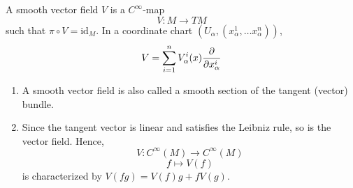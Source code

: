 \begin{definition}
            A smooth vector field \(V\) is a \(C^\infty\)-map
            \[
                V\colon M\to TM    
            \]
            such that \(\pi\circ V=\mathrm{id}_M\). In a coordinate
            chart \(\left(U_\alpha,\left(x^1_\alpha,\ldots
            x^n_\alpha
            \right)\right)\), \[
              V=\sum_{i=1}^n V^i_\alpha(x)\pdv{x^i_\alpha} 
            \]
\end{definition}
\begin{remark}
            \hfill
        \begin{enumerate}[(1)]
                \item A smooth vector field is also called a smooth
                section of the tangent (vector) bundle.
                \item Since the tangent vector is linear and satisfies
                the Leibniz rule, so is the vector field. Hence,
                \[
                    V\colon C^\infty(M)\to C^\infty(M)    
                \]
                \[
                    f\mapsto V(f)    
                \]
                is characterized by 
                \(V(fg)=V(f)g+fV(g)\).
        \end{enumerate}
\end{remark}
